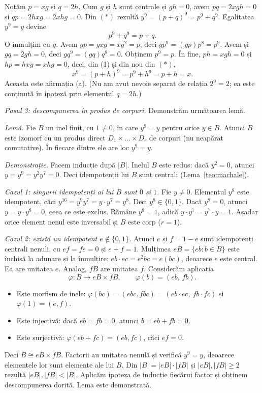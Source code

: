 \begin{solutie}
Notăm $p=xg$ și $q=2h$. Cum $g$ și $h$ sunt centrale și $gh=0$, avem $pq=2xgh=0$ și $qp=2hxg=2xhg=0$. Din $(\ast)$ rezultă $y^{9}=(p+q)^{9}=p^{9}+q^{9}$. Egalitatea $y^{9}=y$ devine
\[
  p^{9}+q^{9}=p+q .
\]
O înmulțim cu $g$. Avem $gp=gxg=xg^{2}=p$, deci $gp^{9}=(gp)p^{8}=p^{9}$. Avem și $gq=2gh=0$, deci $gq^{9}=(gq)q^{8}=0$. Obținem $p^{9}=p$. În fine, $ph=xgh=0$ și $hp=hxg=xhg=0$, deci, din (1) și din nou din $(\ast)$,
\[
  x^{9}=(p+h)^{9}=p^{9}+h^{9}=p+h=x .
\]
Aceasta este afirmația (a). (Nu am avut nevoie separat de relația $2^{9}=2$; ea este conținută în ipoteză prin elementul $q=2h$.)

\smallskip
\textit{Pasul 3: descompunerea în produs de corpuri.} Demonstrăm următoarea lemă.

\emph{Lemă.} Fie $B$ un inel finit, cu $1\neq 0$, în care $y^{9}=y$ pentru orice $y\in B$. Atunci $B$ este izomorf cu un produs direct $D_1\times\dots\times D_r$ de corpuri (nu neapărat comutative). În fiecare dintre ele are loc $y^{9}=y$.

\emph{Demonstrație.} Facem inducție după $|B|$. Inelul $B$ este redus: dacă $y^{2}=0$, atunci $y=y^{9}=y^{2}y^{7}=0$. Deci idempotenții lui $B$ sunt centrali (Lema~\ref{teo:machale}).

\emph{Cazul 1: singurii idempotenți ai lui $B$ sunt $0$ și $1$.} Fie $y\neq 0$. Elementul $y^{8}$ este idempotent, căci $y^{16}=y^{9}y^{7}=y\cdot y^{7}=y^{8}$. Deci $y^{8}\in\{0,1\}$. Dacă $y^{8}=0$, atunci $y=y\cdot y^{8}=0$, ceea ce este exclus. Rămâne $y^{8}=1$, adică $y\cdot y^{7}=y^{7}\cdot y=1$. Așadar orice element nenul este inversabil și $B$ este corp ($r=1$).

\emph{Cazul 2: există un idempotent $e\notin\{0,1\}$.} Atunci $e$ și $f=1-e$ sunt idempotenți centrali nenuli, cu $ef=fe=0$ și $e+f=1$. Mulțimea $eB=\{eb : b\in B\}$ este închisă la adunare și la înmulțire: $eb\cdot ec=e^{2}bc=e(bc)$, deoarece $e$ este central. Ea are unitatea $e$. Analog, $fB$ are unitatea $f$. Considerăm aplicația
\[
  \varphi:B\to eB\times fB,\qquad \varphi(b)=(eb,\,fb).
\]
\begin{itemize}[nosep,leftmargin=1.4em]
  \item Este morfism de inele: $\varphi(bc)=(ebc,fbc)=(eb\cdot ec,\ fb\cdot fc)$ și $\varphi(1)=(e,f)$.
  \item Este injectivă: dacă $eb=fb=0$, atunci $b=eb+fb=0$.
  \item Este surjectivă: $\varphi(eb+fc)=(eb,fc)$, căci $ef=0$.
\end{itemize}
Deci $B\cong eB\times fB$. Factorii au unitatea nenulă și verifică $y^{9}=y$, deoarece elementele lor sunt elemente ale lui $B$. Din $|B|=|eB|\cdot|fB|$ și $|eB|,|fB|\ge 2$ rezultă $|eB|,|fB|<|B|$. Aplicăm ipoteza de inducție fiecărui factor și obținem descompunerea dorită. Lema este demonstrată.


\end{solutie}
